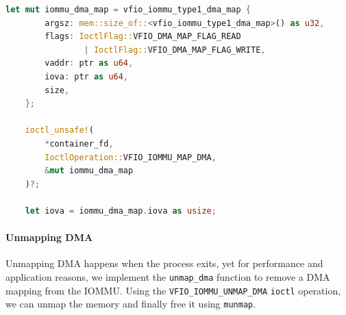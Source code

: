 \begin{lstlisting}[language=Rust,caption={Mapping memory for DMA}, label=lst:mapdma]
    let mut iommu_dma_map = vfio_iommu_type1_dma_map {
        argsz: mem::size_of::<vfio_iommu_type1_dma_map>() as u32,
        flags: IoctlFlag::VFIO_DMA_MAP_FLAG_READ 
                | IoctlFlag::VFIO_DMA_MAP_FLAG_WRITE,
        vaddr: ptr as u64,
        iova: ptr as u64,
        size,
    };

    ioctl_unsafe!(
        *container_fd,
        IoctlOperation::VFIO_IOMMU_MAP_DMA,
        &mut iommu_dma_map
    )?;

    let iova = iommu_dma_map.iova as usize; 
\end{lstlisting}

\paragraph{Unmapping DMA}
Unmapping DMA happens when the process exits, yet for performance and application reasons, we implement the \texttt{unmap\_dma} function to remove a DMA mapping from the IOMMU. Using the \texttt{VFIO\_IOMMU\_UNMAP\_DMA} \texttt{ioctl} operation, we can unmap the memory and finally free it using \texttt{munmap}.

\newpage

